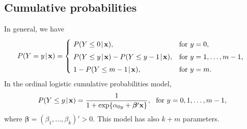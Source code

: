 \documentclass[man,floatmark,12pt]{apa}
\begin{document}
\subsection{Cumulative probabilities}
In general, we have
\[P(Y=y\!\mid\!\mathbf{x})=\left\{\begin{array}{ll}
\rule{0cm}{0.4cm}\!P(Y\leq 0\!\mid\!\mathbf{x}),&\textup{for $y=0$},\\
\rule{0cm}{0.5cm}\!P(Y\leq y\!\mid\!\mathbf{x})-P(Y\leq y-1\!\mid\!\mathbf{x}),&\textup{for $y=1,\ldots,m-1$,}\\
\rule{0cm}{0.5cm}\!1-P(Y\leq m-1\!\mid\!\mathbf{x}),&\textup{for $y=m$}.
\end{array}\right.\]
In the ordinal logistic cumulative probabilities model,
\begin{equation}
P(Y\leq y\!\mid\!\mathbf{x})=\frac{1}{1+\textup{exp}\{\alpha_{0y}+\bm{\beta}'\mathbf{x}\}},\ \ \textup{for $y=0,1,\ldots,m-1$},
\end{equation}
where $\bm{\beta}=(\beta_{1},\ldots,\beta_{k})'>0$. This model has also $k+m$ parameters.
\end{document}
